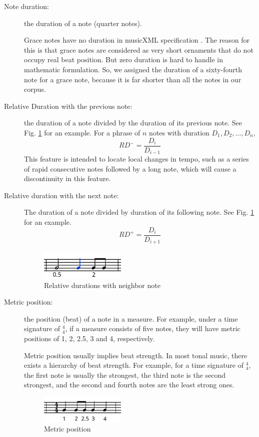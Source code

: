 \begin{description}
         
         \item [Note duration:] the duration of a note (quarter notes). 

            Grace notes have no duration in musicXML specification \cite{musicxml}. The reason for this is that grace notes are considered as very short ornaments that do not occupy real beat position. But zero duration is hard to handle in mathematic formulation. So, we assigned the duration of a sixty-fourth note for a grace note, because it is far shorter than all the notes in our corpus.
         \item [Relative Duration with the previous note:] the duration of a note divided by the duration of its previous note. See Fig. \ref{fig:duration} for an example.
For a phrase of $n$ notes with duration $D_1, D_2, \dots, D_n$, $$RD^- = \frac{D_i}{D_{i-1}} $$             This feature is intended to locate local changes in tempo, such as a series of rapid consecutive notes followed by a long note, which will cause a discontinuity in this feature.
         \item [Relative duration with the next note:] The duration of a note divided by duration of its following note. See Fig. \ref{fig:duration} for an example.
$$RD^+ = \frac{D_i}{D_{i+1}} $$ 

      \begin{figure}[tp]
         \begin{center}
            \includegraphics[width=0.4\textwidth]{fig/duration}
         \end{center}
         \caption{Relative durations with neighbor note}
         \label{fig:duration}
      \end{figure}
   \item [Metric position:] the position (beat) of a note in a measure. For example, under a time signature of $^4_4$, if a measure consists of five notes, they will have metric positions of 1, 2, 2.5, 3 and 4, respectively. 
      
      Metric position usually implies beat strength. In most tonal music, there exists a hierarchy of beat strength. For example, for a time signature of $^4_4$, the first note is usually the strongest, the third note is the second strongest, and the second and fourth notes are the least strong ones. %

   \begin{figure}[tp]
      \begin{center}
         \includegraphics[width=0.4\textwidth]{fig/metrical}
      \end{center}
      \caption{Metric position}
      \label{fig:metrical}
   \end{figure}
      \end{description}

